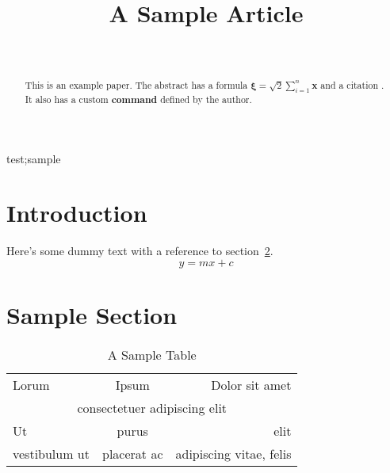 \documentclass[wcp]{jmlr}
\author{\Name{Ann
Other}\Email{sample@nowhere.com}\\\addr{University of Nowhere}}
\title{A Sample Article}
\newcommand*{\boldstuff}[1]{\textbf{#1}}
\begin{document}
\maketitle

\begin{abstract}
This is an example paper. The abstract has a formula
$\boldsymbol{\xi} = \surd2 \sum_{i=1}^n \mathbf{x}$
and a citation \citep{smith2005}. It also has a custom
\boldstuff{command} defined by the author.
\end{abstract}
\begin{keywords}
test;sample
\end{keywords}

\section{Introduction}

Here's some dummy text with a reference to section~\ref{sec:sample}.
\[
 y = mx + c
\]

\section{Sample Section}
\label{sec:sample}

\begin{table}[htbp]
\caption{A Sample Table}\label{tab:sample}
\centering
\begin{tabular}{lcr}
Lorum & Ipsum & Dolor sit amet\\
\multicolumn{3}{c}{consectetuer adipiscing elit}\\
Ut & purus & elit\\
vestibulum ut & placerat ac & adipiscing vitae, felis
\end{tabular}
\end{table}


\end{document}
